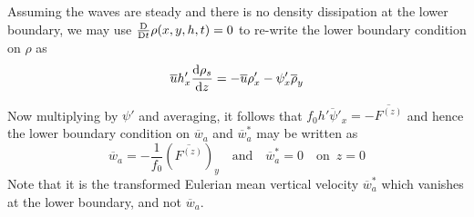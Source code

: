 \documentclass{jknotes}
\begin{document}
Assuming the waves are steady and there is no density dissipation at the lower
boundary, we may use $\frac{\mathrm{D}}{\mathrm{D} t} \rho(x,y,h,t) = 0$ to re-write
the lower boundary condition on $\rho$ as
\begin{equation}
	\overline{u}h'_x \frac{\diffd \rho_s}{\diffd z} = -\overline{u}\rho'_x -
	\psi'_x \overline{\rho}_y
\end{equation}

Now multiplying by $\psi'$ and averaging, it follows that $f_0
\overline{h'\psi'_x} = -\overline{F^{(z)}}$ and hence the lower boundary
condition on $\overline{w}_a$ and $\overline{w}_a^*$ may be written as
\begin{equation}
	\overline{w}_a = -\frac{1}{f_0} (\overline{F^{(z)}})_y \hspace{1em}
	\text{and} \hspace{1em} \overline{w}_a^* = 0 \hspace{1em}
	\text{on}\,\,\, z=0
\end{equation}
Note that it is the transformed Eulerian mean vertical velocity
$\overline{w}_a^*$ which vanishes at the lower boundary, and not
$\overline{w}_a$.
\end{document}
